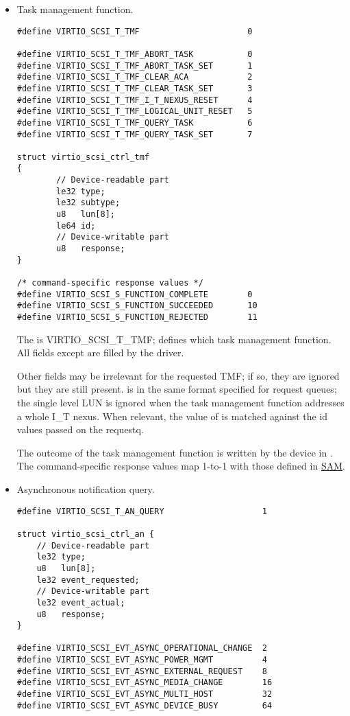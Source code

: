 \begin{itemize}
\item Task management function.
\begin{lstlisting}
#define VIRTIO_SCSI_T_TMF                      0

#define VIRTIO_SCSI_T_TMF_ABORT_TASK           0
#define VIRTIO_SCSI_T_TMF_ABORT_TASK_SET       1
#define VIRTIO_SCSI_T_TMF_CLEAR_ACA            2
#define VIRTIO_SCSI_T_TMF_CLEAR_TASK_SET       3
#define VIRTIO_SCSI_T_TMF_I_T_NEXUS_RESET      4
#define VIRTIO_SCSI_T_TMF_LOGICAL_UNIT_RESET   5
#define VIRTIO_SCSI_T_TMF_QUERY_TASK           6
#define VIRTIO_SCSI_T_TMF_QUERY_TASK_SET       7

struct virtio_scsi_ctrl_tmf
{
        // Device-readable part
        le32 type;
        le32 subtype;
        u8   lun[8];
        le64 id;
        // Device-writable part
        u8   response;
}

/* command-specific response values */
#define VIRTIO_SCSI_S_FUNCTION_COMPLETE        0
#define VIRTIO_SCSI_S_FUNCTION_SUCCEEDED       10
#define VIRTIO_SCSI_S_FUNCTION_REJECTED        11
\end{lstlisting}

  The  is VIRTIO_SCSI_T_TMF;  defines which
  task management function. All
  fields except  are filled by the driver.

  Other fields may be irrelevant for the requested TMF; if so,
  they are ignored but they are still present. 
  is in the same format specified for request queues; the
  single level LUN is ignored when the task management function
  addresses a whole I_T nexus. When relevant, the value of 
  is matched against the id values passed on the requestq.

  The outcome of the task management function is written by the
  device in . The command-specific response
  values map 1-to-1 with those defined in \hyperref[intro:SAM]{SAM}.

\item Asynchronous notification query.
\begin{lstlisting}
#define VIRTIO_SCSI_T_AN_QUERY                    1

struct virtio_scsi_ctrl_an {
    // Device-readable part
    le32 type;
    u8   lun[8];
    le32 event_requested;
    // Device-writable part
    le32 event_actual;
    u8   response;
}

#define VIRTIO_SCSI_EVT_ASYNC_OPERATIONAL_CHANGE  2
#define VIRTIO_SCSI_EVT_ASYNC_POWER_MGMT          4
#define VIRTIO_SCSI_EVT_ASYNC_EXTERNAL_REQUEST    8
#define VIRTIO_SCSI_EVT_ASYNC_MEDIA_CHANGE        16
#define VIRTIO_SCSI_EVT_ASYNC_MULTI_HOST          32
#define VIRTIO_SCSI_EVT_ASYNC_DEVICE_BUSY         64
\end{lstlisting}


\end{itemize}
